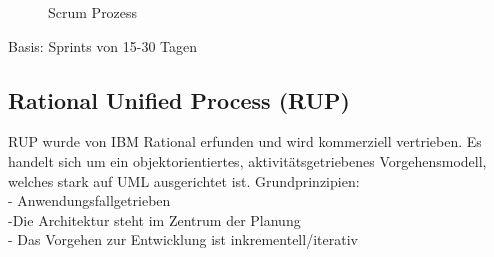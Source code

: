 \begin{figure}[ht]
	\centering
	\caption[]{Scrum Prozess}
\end{figure} 
Basis: Sprints von 15-30 Tagen

\subsection{Rational Unified Process (RUP)}
RUP wurde von IBM Rational erfunden und wird kommerziell vertrieben. Es handelt sich um ein objektorientiertes, aktivitätsgetriebenes Vorgehensmodell, welches stark auf UML ausgerichtet ist. 
Grundprinzipien: \\
- Anwendungsfallgetrieben \\
-Die Architektur steht im Zentrum der Planung \\
- Das Vorgehen zur Entwicklung ist 
inkrementell/iterativ \\

\begin{figure}[ht]
	\centering
\end{figure} 

